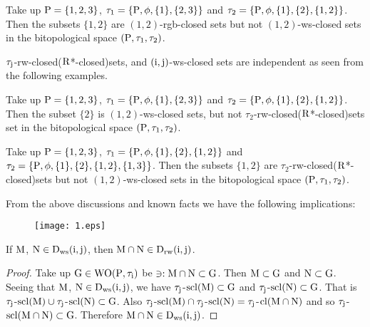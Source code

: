 \begin{exm}\label{exm7.2.20}
Take up $\mathrm{P}=\{1,2,3\}$, $\tau_1 =\{\mathrm{P}, \phi, \{1\}, \{ 2,3\}\}$ and $\tau_2 =\{\TSP, \phi, \{1\},\break \{2\},\{1,2\}\}$. Then the subsets $\{1, 2\}$ are $(1, 2)$-rgb-closed sets but not $(1, 2)$-ws-closed sets in the bitopological space $(\mathrm{P}, \tau_1, \tau_2 )$.
\end{exm}

\begin{rem}\label{rem7.2.21}
$\tau_{\mathrm{j}}$-rw-closed($\mathrm{R}$*-closed)sets, and $(\mathrm{i},\mathrm{j})$-ws-closed sets are independent as seen from the following examples.
\end{rem}

\begin{exm}\label{exm7.2.22}
Take up $\mathrm{P}= \{1,2,3\}$, $\tau_1 =\{\mathrm{P}, \phi, \{1\}, \{2,3\}\}$ and $\tau_2 =\{\TSP, \phi, \{1\},\break \{2\},\{1, 2\}\}$. Then the subset $\{2\}$ is $(1, 2)$-ws-closed sets, but not $\tau_2$-rw-closed($\mathrm{R}$*-closed)sets set in the bitopological space $(\mathrm{P}, \tau_1, \tau_2 )$.
\end{exm}

\begin{exm}\label{exm7.2.23}
Take up $\mathrm{P}=\{1,2,3\}$, $\tau_1 =\{\mathrm{P}, \phi, \{1\}, \{2\}, \{1, 2\}\}$ and $\tau_2 =\{\mathrm{P}, \phi, \{1\},\{2\},\{1,2\},\{1, 3\}\}$. Then the subsets $\{1,2\}$ are $\tau_2$-rw-closed($\mathrm{R}$*-closed)sets but not $(1, 2)$-ws-closed sets in the bitopological space $(\mathrm{P}, \tau_1, \tau_2 )$.
\end{exm}

\begin{rem}\label{rem7.2.24}
From the above discussions and known facts we have the following implications:
\begin{figure}[H]
\centering
\texttt{[image: 1.eps]}
\end{figure}
\end{rem}

\begin{thm}\label{thm7.2.24}
If $\mathrm{M}$, $\mathrm{N}\in \mathrm{D}_{\mathrm{ws}} (\mathrm{i}, \mathrm{j})$, then $\mathrm{M}\cap \mathrm{N}\in \mathrm{D}_{\mathrm{rw}} (\mathrm{i}, \mathrm{j})$.
\end{thm}

\begin{proof}
Take up $\mathrm{G}\in \mathrm{W}\mathrm{O}(\mathrm{P}, \tau_{\mathrm{i}})$ be $\ni: \mathrm{M}\cap \mathrm{N} \subset \mathrm{G}$. Then $\mathrm{M} \subset \mathrm{G}$ and $\mathrm{N} \subset \mathrm{G}$. Seeing that $\mathrm{M}$, $\mathrm{N}\in \mathrm{D}_{\mathrm{ws}} (\mathrm{i}, \mathrm{j})$, we have $\tau_{\mathrm{j}}$-$\mathrm{scl}(\mathrm{M}) \subset \mathrm{G}$ and $\tau_{\mathrm{j}}$-$\mathrm{scl}(\mathrm{N}) \subset \mathrm{G}$. That is $\tau_{\mathrm{j}}$-$\mathrm{scl}(\mathrm{M}) \cup \tau_{\mathrm{j}}$-$\mathrm{scl}(\mathrm{N}) \subset \mathrm{G}$. Also $\tau_{\mathrm{j}}$-$\mathrm{scl}(\mathrm{M}) \cap  \tau_{\mathrm{j}}$-$\mathrm{scl}(\mathrm{N})= \tau_{\mathrm{j}}$-$\mathrm{cl}(\mathrm{M}\cap \mathrm{N})$ and so $\tau_{\mathrm{j}}$-$\mathrm{scl}(\mathrm{M}\cap \mathrm{N}) \subset \mathrm{G}$. Therefore $\mathrm{M}\cap \mathrm{N}\in \mathrm{D}_{\mathrm{ws}} (\mathrm{i}, \mathrm{j})$.
\end{proof}

